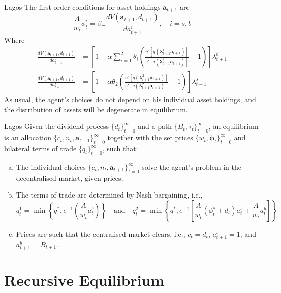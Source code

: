 \documentclass[aspectratio=169,xcolor=dvipsnames]{beamer}
\begin{document}
\begin{frame}{Lagos}
    The first-order conditions for asset holdings $\mathbf{a}_{t+1}$ are
    \[
        \frac{A}{w_t} \phi^i_t = \beta \mathbb{E} \frac{dV(\mathbf{a}_{t+1}, d_{t+1})}{d a^i_{t+1}}, \quad i = s, b
    \]
    Where
    \begin{align*}
        \frac{dV(\mathbf{a}_{t+1}, d_{t+1})}{d a^b_{t+1}} &= \left[ 1 + \alpha \sum_{i=1}^2 \theta_i \left( \frac{u'[q(\boldsymbol{\lambda}^i_{t+1} \mathbf{a}_{t+1})]}{e'[q(\boldsymbol{\lambda}^i_{t+1} \mathbf{a}_{t+1})]} - 1\right)\right] \lambda^b_{t+1} \\
        \frac{dV(\mathbf{a}_{t+1}, d_{t+1})}{d a^s_{t+1}} &= \left[ 1 + \alpha \theta_2 \left( \frac{u'[q(\boldsymbol{\lambda}^2_{t+1} \mathbf{a}_{t+1})]}{e'[q(\boldsymbol{\lambda}^2_{t+1} \mathbf{a}_{t+1})]} - 1\right)\right] \lambda^s_{t+1}
    \end{align*}
    As usual, the agent's choices do not depend on his individual asset holdings, and the distribution of assets will be degenerate in equilibrium.
\end{frame}

\begin{frame}{Lagos}
    Given the dividend process $\{d_t\}_{t=0}^\infty$ and a path $\{B_t, \tau_t\}_{t=0}^\infty$, an equilibrium is an allocation $\{c_t, n_t, \mathbf{a}_{t+1}\}_{t=0}^\infty$ together with the set prices $\{w_t, \boldsymbol{\phi}_t\}_{t=0}^\infty$ and bilateral terms of trade $\{q_t\}_{t=0}^\infty$, such that:
    \begin{enumerate}[(a)]
        \item The individual choices $\{c_t, n_t, \mathbf{a}_{t+1}\}_{t=0}^\infty$ solve the agent's problem in the decentralised market, given prices;
        \item The terms of trade are determined by Nash bargaining, i.e.,
        \[
            q^1_t = \min \left\{ q^*, e^{-1}\left( \frac{A}{w_t} a^b_t\right)\right\} \quad \text{and} \quad q^2_t = \min \left\{ q^*, e^{-1}\left[ \frac{A}{w_t}(\phi^s_t + d_t) a^s_t + \frac{A}{w_t} a^b_t\right]\right\}
        \]
        \item Prices are such that the centralised market clears, i.e., $c_t = d_t$, $a^s_{t+1} = 1$, and $a^b_{t+1} = B_{t+1}$.
    \end{enumerate}
\end{frame}

\section{Recursive Equilibrium}
\end{document}

